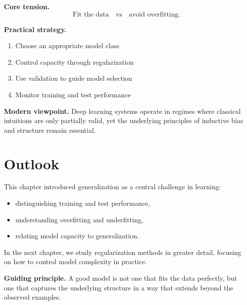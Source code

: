 \medskip

\noindent
\textbf{Core tension.}  
\[
\text{Fit the data} \quad \text{vs} \quad \text{avoid overfitting}.
\]

\medskip

\noindent
\textbf{Practical strategy.}
\begin{enumerate}
    \item Choose an appropriate model class
    \item Control capacity through regularization
    \item Use validation to guide model selection
    \item Monitor training and test performance
\end{enumerate}

\medskip

\noindent
\textbf{Modern viewpoint.}  
Deep learning systems operate in regimes where classical intuitions are only partially valid, yet the underlying principles of inductive bias and structure remain essential.

\section{Outlook}

This chapter introduced generalization as a central challenge in learning:
\begin{itemize}
    \item distinguishing training and test performance,
    \item understanding overfitting and underfitting,
    \item relating model capacity to generalization.
\end{itemize}

\medskip

In the next chapter, we study regularization methods in greater detail, focusing on how to control model complexity in practice.

\medskip

\noindent
\textbf{Guiding principle.}  
A good model is not one that fits the data perfectly, but one that captures the underlying structure in a way that extends beyond the observed examples.